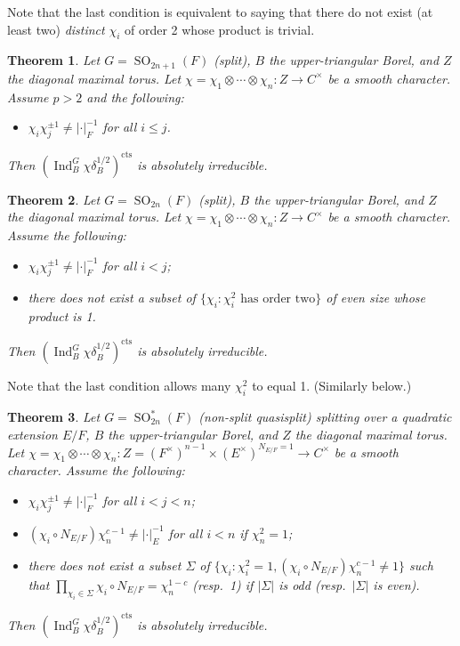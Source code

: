 \documentclass[a4paper]{amsart}
\numberwithin{equation}{section}
\newtheorem{thm}{Theorem}[section]
\theoremstyle{remark}
\theoremstyle{definition}
\DeclareMathOperator{\Ind}{Ind}
\DeclareMathOperator{\SO}{SO}
\newcommand{\cts}{\mathrm{cts}}
\begin{document}
Note that the last condition is equivalent to saying that there do not exist (at least two) \emph{distinct} $\chi_i$ of order 2 whose product is trivial.

\begin{thm}\label{thm:SO2n+1-irred}
  Let $G = \SO_{2n+1}(F)$ (split), $B$ the upper-triangular Borel, and $Z$ the diagonal maximal torus.
  Let $\chi = \chi_{1}\otimes\cdots\otimes\chi_{n}\colon Z\to C^{\times}$ be a smooth character.
  Assume $p > 2$ and the following:
  \begin{itemize}
  \item $\chi_i \chi_j^{\pm 1} \ne \lvert \cdot\rvert_F^{-1}$ for all $i \le j$.
  \end{itemize}
  Then $(\Ind_{B}^{G}\chi\delta_B^{1/2})^{\cts}$ is absolutely irreducible.
\end{thm}

\begin{thm}\label{thm:SO2n-irred}
  Let $G = \SO_{2n}(F)$ (split), $B$ the upper-triangular Borel, and $Z$ the diagonal maximal torus.
  Let $\chi = \chi_{1}\otimes\cdots\otimes\chi_{n}\colon Z\to C^{\times}$ be a smooth character.
  Assume the following:
  \begin{itemize}
  \item $\chi_i \chi_j^{\pm 1} \ne \lvert \cdot\rvert_F^{-1}$ for all $i < j$;
  \item there does not exist a subset of $\{\chi_i : \text{$\chi_i^2$ has order two} \}$ of even size whose product is 1.
  \end{itemize}
  Then $(\Ind_{B}^{G}\chi\delta_B^{1/2})^{\cts}$ is absolutely irreducible.
\end{thm}

Note that the last condition allows many $\chi_i^2$ to equal 1. (Similarly below.)

\begin{thm}\label{thm:SO2n-qsplit-irred}
  Let $G = \SO^*_{2n}(F)$ (non-split quasisplit) splitting over a quadratic extension $E/F$, $B$ the upper-triangular Borel, and $Z$ the diagonal maximal torus.
  Let $\chi = \chi_{1}\otimes\cdots\otimes\chi_{n}\colon Z = (F^\times)^{n-1} \times (E^\times)^{N_{E/F}=1}\to C^{\times}$ be a smooth character.
  Assume the following:
  \begin{itemize}
  \item $\chi_i \chi_j^{\pm 1} \ne \lvert \cdot\rvert_F^{-1}$ for all $i < j < n$;
  \item $(\chi_i \circ N_{E/F}) \chi_n^{c-1} \ne \lvert\cdot\rvert_E^{-1}$ for all $i < n$ if $\chi_n^2 = 1$;
  \item 
    there does not exist a subset $\Sigma$ of $\{\chi_i : \chi_i^2=1, (\chi_i \circ N_{E/F}) \chi_n^{c-1} \ne 1 \}$ such that
    $\prod_{\chi_i \in \Sigma} \chi_i \circ N_{E/F} = \chi_n^{1-c}$ (resp.\ 1) if $|\Sigma|$ is odd (resp.\ $|\Sigma|$ is even).
  \end{itemize}
  Then $(\Ind_{B}^{G}\chi\delta_B^{1/2})^{\cts}$ is absolutely irreducible.
\end{thm}
\end{document}

